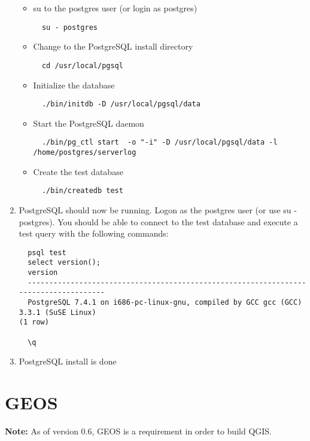 \begin{enumerate}
\begin{itemize}
\item su to the postgres user (or login as postgres)
  \begin{verbatim}
  su - postgres
  \end{verbatim}

  \item Change to the PostgreSQL install directory 
  \begin{verbatim}
  cd /usr/local/pgsql
  \end{verbatim}

  \item Initialize the database 
  \begin{verbatim}
  ./bin/initdb -D /usr/local/pgsql/data
  \end{verbatim}

  \item Start the PostgreSQL daemon 
  \small
  \begin{verbatim}
  ./bin/pg_ctl start  -o "-i" -D /usr/local/pgsql/data -l /home/postgres/serverlog 
  \end{verbatim} 
  
  \item Create the test database
  
  \begin{verbatim}
  ./bin/createdb test
  \end{verbatim}
  \normalsize
  \end{itemize}
  \item PostgreSQL should now be running. Logon as the postgres user (or use su - postgres). You should be able to connect to the test database and execute a test query with the following commands: 

  \begin{verbatim}
  psql test
  select version();
  version
  -------------------------------------------------------------------------------------
  PostgreSQL 7.4.1 on i686-pc-linux-gnu, compiled by GCC gcc (GCC) 3.3.1 (SuSE Linux)
(1 row)

  \q
  \end{verbatim}


  \item PostgreSQL install is done
  \end{enumerate}

  \section{GEOS}

  \textbf{Note:} As of version 0.6, GEOS is a requirement in order to build QGIS.
  
